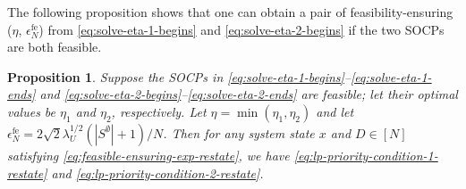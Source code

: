 \documentclass[11pt,letterpaper]{article}
\theoremstyle{plain}
\newtheorem{proposition}{Proposition}
\theoremstyle{definition}
\theoremstyle{remark}
\newcommand{\sempty}{S^{\emptyset}}
\newcommand{\umat}{U}
\newcommand{\errfe}{\epsilon_N^{\text{fe}}}
\newcommand{\lamu}{\lambda_\umat}
\begin{document}
The following proposition shows that one can obtain a pair of feasibility-ensuring ($\eta$, $\errfe$) from \eqref{eq:solve-eta-1-begins} and \eqref{eq:solve-eta-2-begins} if the two SOCPs are both feasible. 

\begin{proposition}\label{prop:socp-feasible-ensuring}
    Suppose the SOCPs in \eqref{eq:solve-eta-1-begins}--\eqref{eq:solve-eta-1-ends} and \eqref{eq:solve-eta-2-begins}--\eqref{eq:solve-eta-2-ends} are feasible; let their optimal values be $\eta_1$ and $\eta_2$, respectively. Let $\eta = \min(\eta_1, \eta_2)$ and let $\errfe = 2\sqrt{2} \lamu^{1/2} (|\sempty|+1) / N$. Then for any system state $x$ and $D\in [N]$ satisfying
    \eqref{eq:feasible-ensuring-exp-restate}, we have \eqref{eq:lp-priority-condition-1-restate} and \eqref{eq:lp-priority-condition-2-restate}. 
\end{proposition}
\end{document}
